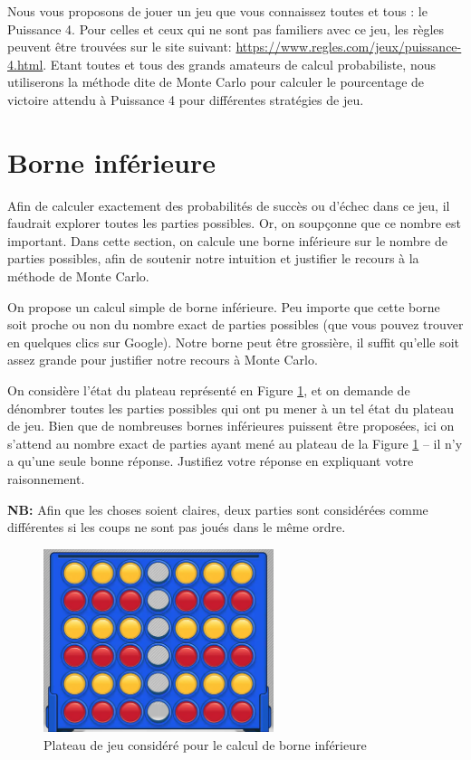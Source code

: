 \documentclass[11pt,answers]{exam}
\begin{document}
Nous vous proposons de jouer un jeu que vous connaissez toutes et tous : le Puissance 4. Pour celles et ceux qui ne sont pas familiers avec ce jeu, les règles peuvent être trouvées sur le site suivant: \href{https://www.regles.com/jeux/puissance-4.html}{https://www.regles.com/jeux/puissance-4.html}. Etant toutes et tous des grands amateurs de calcul probabiliste, nous utiliserons la méthode dite de Monte Carlo pour calculer le pourcentage de victoire attendu à Puissance 4 pour différentes stratégies de jeu. 

\medskip

\section{Borne inférieure} \label{sec:borne_inf}

Afin de calculer exactement des probabilités de succès ou d'échec dans ce jeu, il faudrait explorer toutes les parties possibles. Or, on soupçonne que ce nombre est important. Dans cette section, on calcule une borne inférieure sur le nombre de parties possibles, afin de soutenir notre intuition et justifier le recours à la méthode de Monte Carlo.

On propose un calcul simple de borne inférieure. Peu importe que cette borne soit proche ou non du nombre exact de parties possibles (que vous pouvez trouver en quelques clics sur Google). Notre borne peut être grossière, il suffit qu'elle soit assez grande pour justifier notre recours à Monte Carlo.

On considère l'état du plateau représenté en Figure \ref{fig:bound}, et on demande de dénombrer toutes les parties possibles qui ont pu mener à un tel état du plateau de jeu. Bien que de nombreuses bornes inférieures puissent être proposées, ici on s'attend au nombre exact de parties ayant mené au plateau de la Figure \ref{fig:bound} -- il n'y a qu'une seule bonne réponse. Justifiez votre réponse en expliquant votre raisonnement.

\textbf{NB:} Afin que les choses soient claires, deux parties sont considérées comme différentes si les coups ne sont pas joués dans le même ordre.

\begin{figure}[!ht]
	\centering
	\includegraphics[width=0.6\textwidth]{board.png}
 	\caption{Plateau de jeu considéré pour le calcul de borne inférieure}
	\label{fig:bound}
\end{figure}
\end{document}
